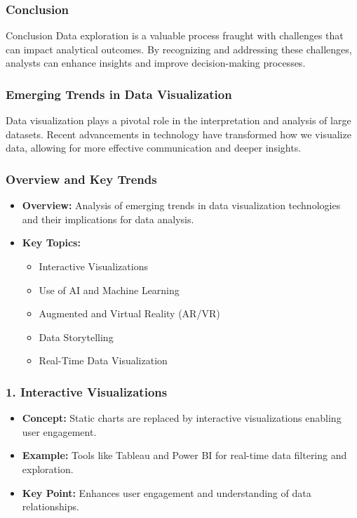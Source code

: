 \documentclass[aspectratio=169]{beamer}
\begin{document}
\begin{frame}[fragile]
    \frametitle{Conclusion}
    \begin{block}{Conclusion}
        Data exploration is a valuable process fraught with challenges that can impact analytical outcomes. By recognizing and addressing these challenges, analysts can enhance insights and improve decision-making processes.
    \end{block}
\end{frame}

\begin{frame}[fragile]
    \frametitle{Emerging Trends in Data Visualization}
    Data visualization plays a pivotal role in the interpretation and analysis of large datasets. Recent advancements in technology have transformed how we visualize data, allowing for more effective communication and deeper insights.
\end{frame}

\begin{frame}[fragile]
    \frametitle{Overview and Key Trends}
    \begin{itemize}
        \item \textbf{Overview:} Analysis of emerging trends in data visualization technologies and their implications for data analysis.
        \item \textbf{Key Topics:}
        \begin{itemize}
            \item Interactive Visualizations
            \item Use of AI and Machine Learning
            \item Augmented and Virtual Reality (AR/VR)
            \item Data Storytelling
            \item Real-Time Data Visualization
        \end{itemize}
    \end{itemize}
\end{frame}

\begin{frame}[fragile]
    \frametitle{1. Interactive Visualizations}
    \begin{itemize}
        \item \textbf{Concept:} Static charts are replaced by interactive visualizations enabling user engagement.
        \item \textbf{Example:} Tools like Tableau and Power BI for real-time data filtering and exploration.
        \item \textbf{Key Point:} Enhances user engagement and understanding of data relationships.
    \end{itemize}
\end{frame}
\end{document}
